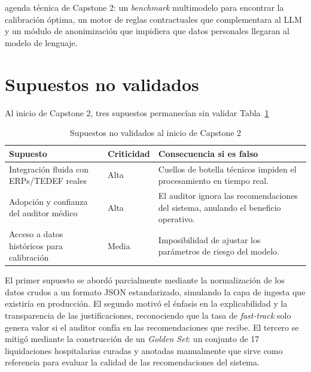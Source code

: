 agenda técnica de Capstone 2: un \textit{benchmark} multimodelo para encontrar la calibración óptima, un motor de reglas contractuales que complementara al LLM y un módulo de anonimización que impidiera que datos personales llegaran al modelo de lenguaje.

\section{Supuestos no validados}

Al inicio de Capstone 2, tres supuestos permanecían sin validar Tabla~\ref{tab:supuestos-no-validados}
\begin{table}[H]
    \centering
    \caption{Supuestos no validados al inicio de Capstone 2}
    \label{tab:supuestos-no-validados}

    \begin{tabular}{
        p{}
        p{}
        p{}
    }
        \toprule
        \textbf{Supuesto}
        & \textbf{Criticidad}
        & \textbf{Consecuencia si es falso} \\
        \midrule

        Integración fluida con ERPs/TEDEF reales
        & Alta
        & Cuellos de botella técnicos impiden el procesamiento en tiempo real. \\

        Adopción y confianza del auditor médico
        & Alta
        & El auditor ignora las recomendaciones del sistema, anulando el beneficio operativo. \\

        Acceso a datos históricos para calibración
        & Media
        & Imposibilidad de ajustar los parámetros de riesgo del modelo. \\

        \bottomrule
    \end{tabular}
\end{table}

El primer supuesto se abordó parcialmente mediante la normalización de los datos crudos a un formato JSON estandarizado, simulando la capa de ingesta que existiría en producción. El segundo motivó el énfasis en la explicabilidad y la transparencia de las justificaciones, reconociendo que la tasa de \textit{fast-track} solo genera valor si el auditor confía en las recomendaciones que recibe. El tercero se mitigó mediante la construcción de un \textit{Golden Set}: un conjunto de 17 liquidaciones hospitalarias curadas y anotadas manualmente que sirve como referencia para evaluar la calidad de las recomendaciones del sistema.

